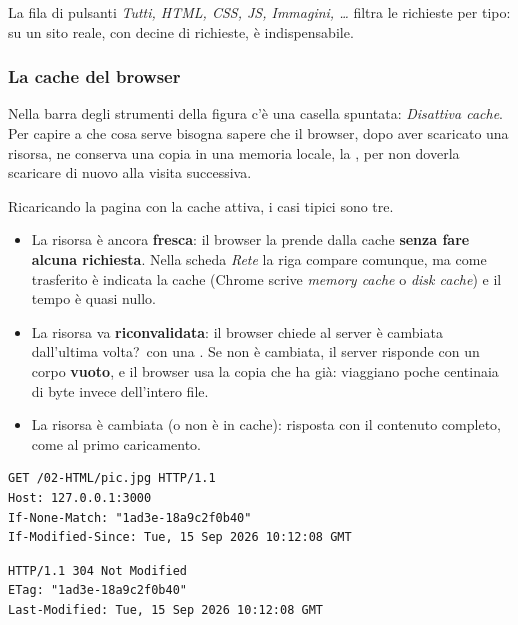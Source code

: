 La fila di pulsanti \textit{Tutti, HTML, CSS, JS, Immagini, \ldots} filtra le
richieste per tipo: su un sito reale, con decine di richieste, è indispensabile.

\subsubsection{La cache del browser}

Nella barra degli strumenti della figura c'è una casella spuntata:
\textit{Disattiva cache}. Per capire a che cosa serve bisogna sapere che il
browser, dopo aver scaricato una risorsa, ne conserva una copia in una memoria
locale, la , per non doverla scaricare di nuovo alla visita
successiva.


Ricaricando la pagina con la cache attiva, i casi tipici sono tre.

\begin{itemize}
  \item La risorsa è ancora \textbf{fresca}: il browser la prende dalla cache
        \textbf{senza fare alcuna richiesta}. Nella scheda \textit{Rete} la riga
        compare comunque, ma come trasferito è indicata la cache (Chrome scrive
        \textit{memory cache} o \textit{disk cache}) e il tempo è quasi nullo.
  \item La risorsa va \textbf{riconvalidata}: il browser chiede al server
        \guillemotleft è cambiata dall'ultima volta?\guillemotright\ con una
        . Se non è cambiata, il server risponde
         con un corpo \textbf{vuoto}, e il browser usa la
        copia che ha già: viaggiano poche centinaia di byte invece dell'intero
        file.
  \item La risorsa è cambiata (o non è in cache): risposta  con il
        contenuto completo, come al primo caricamento.
\end{itemize}

\begin{affianco}[0.5]
\begin{lstlisting}[style=http, name=richiesta condizionale]
GET /02-HTML/pic.jpg HTTP/1.1
Host: 127.0.0.1:3000
If-None-Match: "1ad3e-18a9c2f0b40"
If-Modified-Since: Tue, 15 Sep 2026 10:12:08 GMT
\end{lstlisting}
\risultato
\begin{lstlisting}[style=http, name=risposta del server]
HTTP/1.1 304 Not Modified
ETag: "1ad3e-18a9c2f0b40"
Last-Modified: Tue, 15 Sep 2026 10:12:08 GMT
\end{lstlisting}
\end{affianco}

